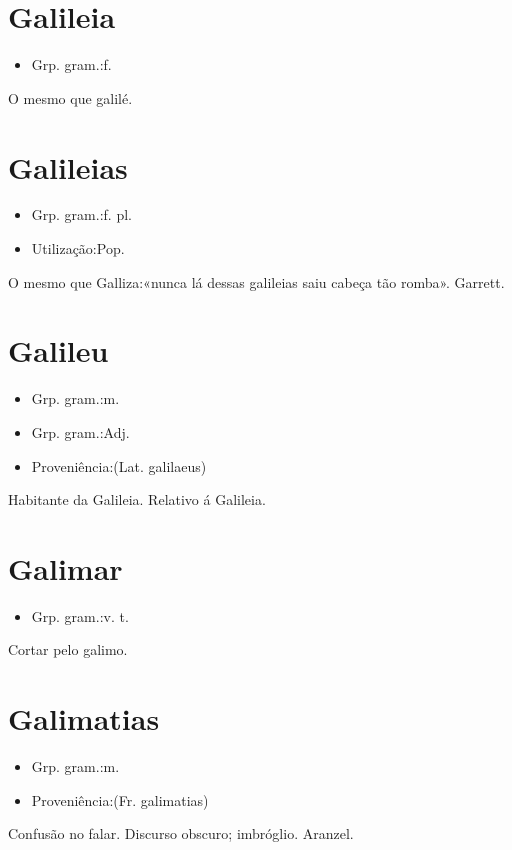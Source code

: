 \section{Galileia}
\begin{itemize}
\item {Grp. gram.:f.}
\end{itemize}
O mesmo que \textunderscore galilé\textunderscore .
\section{Galileias}
\begin{itemize}
\item {Grp. gram.:f. pl.}
\end{itemize}
\begin{itemize}
\item {Utilização:Pop.}
\end{itemize}
O mesmo que \textunderscore Galliza\textunderscore :«\textunderscore nunca lá dessas galileias saiu cabeça tão romba\textunderscore ». Garrett.
\section{Galileu}
\begin{itemize}
\item {Grp. gram.:m.}
\end{itemize}
\begin{itemize}
\item {Grp. gram.:Adj.}
\end{itemize}
\begin{itemize}
\item {Proveniência:(Lat. \textunderscore galilaeus\textunderscore )}
\end{itemize}
Habitante da Galileia.
Relativo á Galileia.
\section{Galimar}
\begin{itemize}
\item {Grp. gram.:v. t.}
\end{itemize}
Cortar pelo galimo.
\section{Galimatias}
\begin{itemize}
\item {Grp. gram.:m.}
\end{itemize}
\begin{itemize}
\item {Proveniência:(Fr. \textunderscore galimatias\textunderscore )}
\end{itemize}
Confusão no falar.
Discurso obscuro; imbróglio.
Aranzel.
